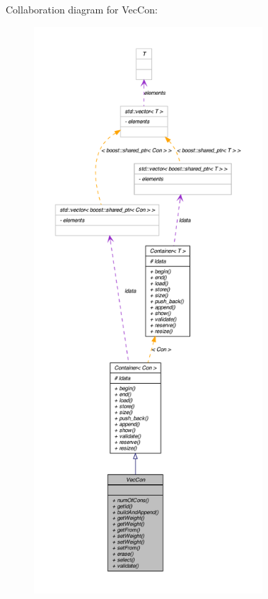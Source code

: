 Collaboration diagram for VecCon:
\nopagebreak
\begin{figure}[H]
\begin{center}
\leavevmode
\includegraphics[height=600pt]{class_vec_con__coll__graph}
\end{center}
\end{figure}
